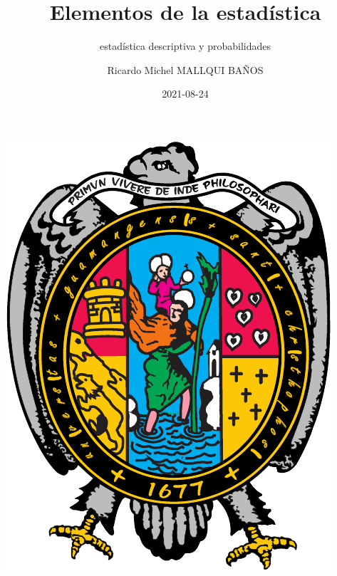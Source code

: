\documentclass[10pt,]{krantz}
\title{Elementos de la estadística}
\subtitle{estadística descriptiva y probabilidades}
\author{Ricardo Michel MALLQUI BAÑOS}
\date{2021-08-24}
\let\oldincludegraphics\includegraphics
\renewcommand\includegraphics[2][]{%
  \oldincludegraphics[scale=0.85]{#2}
}
\theoremstyle{definition}
\theoremstyle{definition}
\theoremstyle{definition}
\theoremstyle{definition}
\theoremstyle{remark}
\begin{document}
\maketitle

\thispagestyle{empty}
\begin{center}
\includegraphics{U.pdf}
\end{center}


{
\hypersetup{linkcolor=}
\setcounter{tocdepth}{2}
\tableofcontents
}
\listoftables
\listoffigures
\newcommand{\N}{\mathbb{N}}
\newcommand{\R}{\mathbb{R}}
\newcommand{\CC}{\mathbb{C}}
\newcommand{\I}{\mathbb{I}}
\newcommand{\f}{\mathbb{f}}
\newcommand{\X}{\mathbb{X}}
\newcommand{\D}{\mathbb{D}}
\newcommand{\Z}{\mathbb{Z}}
\newcommand{\Q}{\mathbb{Q}}
\newcommand{\norm}[1]{\left\Vert#1\right\Vert}
\newcommand{\abs}[1]{\left\vert#1\right\vert}
\newcommand{\set}[1]{\left\{#1\right\}}
\newcommand{\seq}[1]{\left<#1\right>}
\newcommand{\co}[1]{\left[#1\right]}
\newcommand{\cc}[1]{\left(#1\right)}
\newcommand{\J}{\mathcal{J}}
\newcommand{\K}{\mathcal{K}}
\newcommand{\M}{\mathcal{M}}
\newcommand{\F}{\mathcal{F}}
\end{document}
